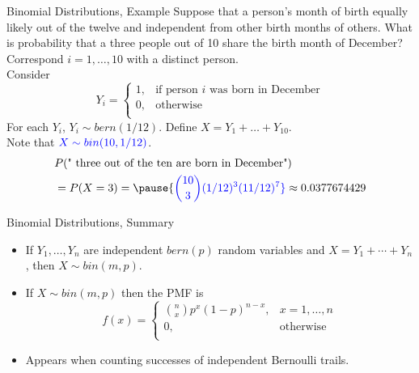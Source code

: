 \documentclass[handout]{beamer}
\newcommand{\blue}[1]{{\color{blue} #1}}
\newcommand{\nl}[1]{\vspace{#1 em}}
\begin{document}
    \begin{frame}{Binomial Distributions, Example}
        Suppose that a person's month of birth equally likely out of the twelve and independent from other birth months of others. What is probability that a three people out of 10 share the birth month of December?\\
        \pause \nl{0.5} 
        Correspond $i=1,\ldots, 10$ with a distinct person.\\
        Consider 
        $$Y_i = 
            \left\{\begin{array}{lr}
                1, &  \text{if person } i \text{ was born in December}\\
                0, & \text{otherwise}\\
                \end{array}\right.
            $$
        For each $Y_i$, $Y_i \sim bern(1/12)$. Define $X = Y_1 + \ldots + Y_{10}$.\\ Note that $\blue{X \sim bin(10,1/12)}$.
        \pause
        \begin{align*}
        & P(\text{" three out of the ten are born in December"}) \\
        & = P(X = 3) = \pause \blue{\binom{10}{3} (1/12)^3 (11/12)^7} \approx 0.0377674429
        \end{align*}
    \end{frame}
    \begin{frame}{Binomial Distributions, Summary}
        \begin{itemize}
            \item If $Y_1, \ldots, Y_n$ are independent $bern(p)$ random variables and $X = Y_1 + \cdots + Y_n$, then $X \sim bin(m,p)$.
            \item If $X \sim bin(m,p)$ then the PMF is
            $$f(x) = 
            \left\{\begin{array}{lr}
                \binom{n}{x} p^x (1-p)^{n-x}, &  x = 1, \ldots, n\\
                0, & \text{otherwise}\\
                \end{array}\right.
            $$
            \item Appears when counting successes of independent Bernoulli trails.
        \end{itemize}
    \end{frame}
\end{document}
